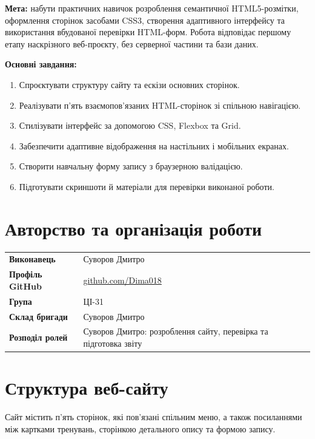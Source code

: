 \documentclass[12pt,a4paper]{article}
\newcommand{\AuthorName}{Суворов Дмитро}
\newcommand{\StudentGroup}{ЦІ-31}
\begin{document}
\textbf{Мета:} набути практичних навичок розроблення семантичної HTML5-розмітки, оформлення сторінок засобами CSS3, створення адаптивного інтерфейсу та використання вбудованої перевірки HTML-форм. Робота відповідає першому етапу наскрізного веб-проєкту, без серверної частини та бази даних.

\textbf{Основні завдання:}
\begin{enumerate}
\item Спроєктувати структуру сайту та ескізи основних сторінок.
\item Реалізувати п'ять взаємопов'язаних HTML-сторінок зі спільною навігацією.
\item Стилізувати інтерфейс за допомогою CSS, Flexbox та Grid.
\item Забезпечити адаптивне відображення на настільних і мобільних екранах.
\item Створити навчальну форму запису з браузерною валідацією.
\item Підготувати скриншоти й матеріали для перевірки виконаної роботи.
\end{enumerate}

\section{Авторство та організація роботи}
\noindent\begin{tabularx}{\textwidth}{>{\RaggedRight\arraybackslash\bfseries}p{38mm}X}
\toprule
Виконавець & \AuthorName\\
Профіль GitHub & \href{https://github.com/Dima018}{github.com/Dima018}\\
Група & \StudentGroup\\
Склад бригади & Суворов Дмитро\\
Розподіл ролей & \AuthorName: розроблення сайту, перевірка та підготовка звіту\\
\bottomrule
\end{tabularx}

\section{Структура веб-сайту}
Сайт містить п'ять сторінок, які пов'язані спільним меню, а також посиланнями між картками тренувань, сторінкою детального опису та формою запису.
\end{document}
